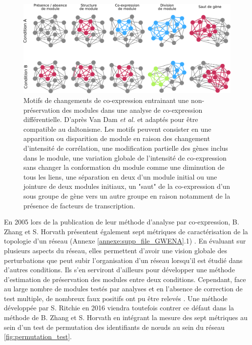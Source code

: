 \begin{figure}
    \centering
    \includegraphics[width=\textwidth]{img/intro/3_coexpr/intro_3_coexpr_codiff.pdf}
    \caption[Motifs de changements de co-expression entrainant une non-préservation des modules dans une analyse de co-expression différentielle]{Motifs de changements de co-expression entrainant une non-préservation des modules dans une analyse de co-expression différentielle. D'après Van Dam \textit{et al.} \cite{VanDam2018} et adaptés pour être compatible au daltonisme. Les motifs peuvent consister en une apparition ou disparition de module en raison des changement d'intensité de corrélation, une modification partielle des gènes inclus dans le module, une variation globale de l'intensité de co-expression sans changer la conformation du module comme une diminution de tous les liens, une séparation en deux d'un module initial ou une jointure de deux modules initiaux, un "saut" de la co-expression d'un sous groupe de gène vers un autre groupe en raison notamment de la présence de facteurs de transcription.}
    \label{fig:differential_coexpression_patterns}
\end{figure}



En 2005 lors de la publication de leur méthode d'analyse par co-expression, B. Zhang et S. Horvath présentent également sept métriques de caractérisation de la topologie d'un réseau (Annexe \ref{annexe:supp_file_GWENA}.1) \cite{Zhang2005a}. En évaluant sur plusieurs aspects du réseau, elles permettent d'avoir une vision globale des perturbations que peut subir l'organisation d'un réseau lorsqu'il est étudié dans d'autres conditions. Ils s'en serviront d'ailleurs pour développer une méthode d'estimation de préservation des modules entre deux conditions. Cependant, face au large nombre de modules testés par analyses et en l'absence de correction de test multiple, de nombreux faux positifs ont pu être relevés \cite{Ritchie2016}. Une méthode développée par S. Ritchie en 2016 viendra toutefois contrer ce défaut dans la méthode de B. Zhang et S. Horvath en intégrant la mesure des sept métriques au sein d'un test de permutation des identifiants de nœuds au sein du réseau \ref{fig:permutation_test}. 

